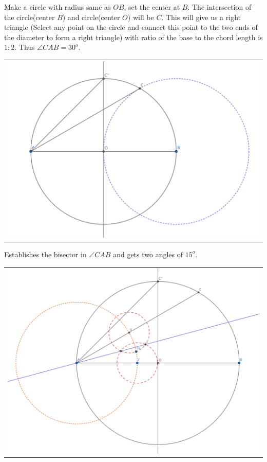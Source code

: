 \documentclass[letter,12pt]{article}
\begin{document}
Make a circle with radius same as $OB$, set the center at $B$. The intersection of the circle(center $B$) and circle(center $O$) will be $C$. This will give us a right triangle (Select any point on the circle and connect this point to the two ends of the diameter to form a right triangle) with ratio of the base to the chord length is $1:2$. Thus $\angle CAB = 30^o$.
\begin{center}
	\begin{tabular}{c}
		\includegraphics[width=0.7\columnwidth]{Q1A_3.png} \\
	\end{tabular}
\end{center}

Establishes the bisector in $\angle CAB$ and gets two angles of $15^o$.
\begin{center}
	\begin{tabular}{c}
		\includegraphics[width=0.7\columnwidth]{Q1A_4.png} \\
	\end{tabular}
\end{center}
\end{document}
